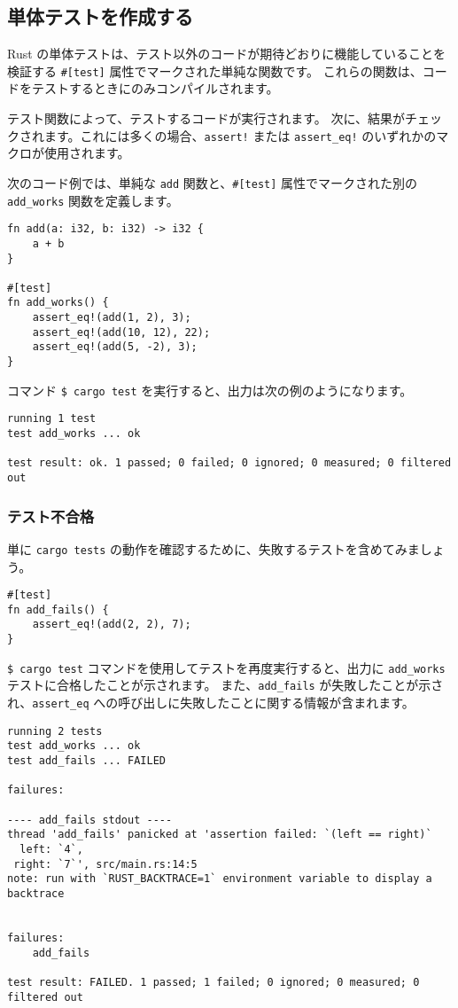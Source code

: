 \subsection{単体テストを作成する}

Rust の単体テストは、テスト以外のコードが期待どおりに機能していることを検証する \texttt{\#[test]} 属性でマークされた単純な関数です。 これらの関数は、コードをテストするときにのみコンパイルされます。

テスト関数によって、テストするコードが実行されます。 次に、結果がチェックされます。これには多くの場合、\texttt{assert!} または \texttt{assert\_eq!} のいずれかのマクロが使用されます。

次のコード例では、単純な \texttt{add} 関数と、\texttt{\#[test]} 属性でマークされた別の \texttt{add\_works} 関数を定義します。

\begin{lstlisting}[numbers=none]
fn add(a: i32, b: i32) -> i32 {
    a + b
}

#[test]
fn add_works() {
    assert_eq!(add(1, 2), 3);
    assert_eq!(add(10, 12), 22);
    assert_eq!(add(5, -2), 3);
}
\end{lstlisting}

コマンド \texttt{\$ cargo test} を実行すると、出力は次の例のようになります。

\begin{lstlisting}[numbers=none]
running 1 test
test add_works ... ok

test result: ok. 1 passed; 0 failed; 0 ignored; 0 measured; 0 filtered out
\end{lstlisting}

\subsubsection{テスト不合格}

単に \texttt{cargo tests} の動作を確認するために、失敗するテストを含めてみましょう。

\begin{lstlisting}[numbers=none]
#[test]
fn add_fails() {
    assert_eq!(add(2, 2), 7);
}
\end{lstlisting}

\texttt{\$ cargo test} コマンドを使用してテストを再度実行すると、出力に \texttt{add\_works} テストに合格したことが示されます。 また、\texttt{add\_fails} が失敗したことが示され、\texttt{assert\_eq} への呼び出しに失敗したことに関する情報が含まれます。

\begin{lstlisting}[numbers=none]
running 2 tests
test add_works ... ok
test add_fails ... FAILED

failures:

---- add_fails stdout ----
thread 'add_fails' panicked at 'assertion failed: `(left == right)`
  left: `4`,
 right: `7`', src/main.rs:14:5
note: run with `RUST_BACKTRACE=1` environment variable to display a backtrace


failures:
    add_fails

test result: FAILED. 1 passed; 1 failed; 0 ignored; 0 measured; 0 filtered out
\end{lstlisting}

